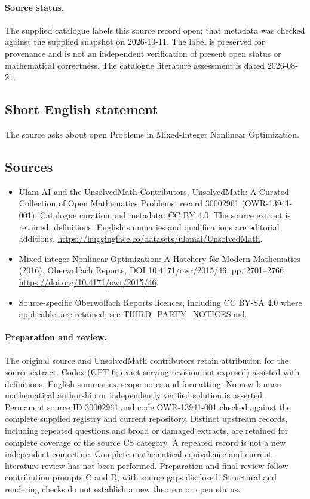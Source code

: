 \documentclass[11pt]{article}
\begin{document}
\paragraph{Source status.}
The supplied catalogue labels this source record open; that metadata was checked against the supplied snapshot on 2026-10-11. The label is preserved for provenance and is not an independent verification of present open status or mathematical correctness. The catalogue literature assessment is dated 2026-08-21.
\subsection{Short English statement}
The source asks about open Problems in Mixed-Integer Nonlinear Optimization.
\subsection{Sources}
\begin{itemize}
\item[\hypertarget{source:30002961:1}{S1}] Ulam AI and the UnsolvedMath Contributors, UnsolvedMath: A Curated Collection of Open Mathematics Problems, record 30002961 (OWR-13941-001). Catalogue curation and metadata: CC BY 4.0. The source extract is retained; definitions, English summaries and qualifications are editorial additions.
\url{https://huggingface.co/datasets/ulamai/UnsolvedMath}.
\item[\hypertarget{source:30002961:2}{S2}] Mixed-integer Nonlinear Optimization: A Hatchery for Modern Mathematics (2016), Oberwolfach Reports, DOI 10.4171/owr/2015/46, pp. 2701--2766
\url{https://doi.org/10.4171/owr/2015/46}.
\item Source-specific Oberwolfach Reports licences, including CC BY-SA 4.0 where applicable, are retained; see THIRD\_PARTY\_NOTICES.md.
\end{itemize}
\paragraph{Preparation and review.}
The original source and UnsolvedMath contributors retain attribution for the source extract. Codex (GPT-6; exact serving revision not exposed) assisted with definitions, English summaries, scope notes and formatting. No new human mathematical authorship or independently verified solution is asserted. Permanent source ID 30002961 and code OWR-13941-001 checked against the complete supplied registry and current repository. Distinct upstream records, including repeated questions and broad or damaged extracts, are retained for complete coverage of the source CS category. A repeated record is not a new independent conjecture. Complete mathematical-equivalence and current-literature review has not been performed. Preparation and final review follow contribution prompts C and D, with source gaps disclosed. Structural and rendering checks do not establish a new theorem or open status.
\label{end:30002961}
\end{document}
